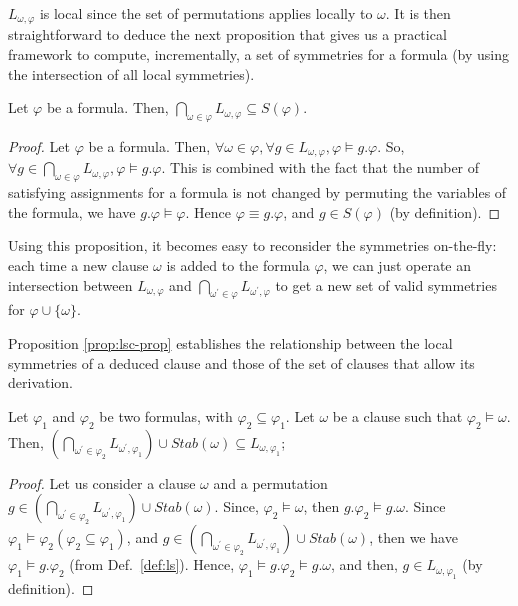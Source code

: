 $L_{\omega,\varphi}$ is local since the set of permutations applies locally to
$\omega$. It is then straightforward to deduce the next proposition that gives us a
practical framework to compute, incrementally, a set of symmetries for a
formula (by using the intersection of all local symmetries).

\begin{proposition}
	\label{prop:gls-prop}
	Let $\varphi$ be a formula. Then,  $\underset{\omega \in \varphi}{\bigcap}L_{\omega,\varphi} 
	\subseteq S(\varphi)$.
\end{proposition}

\begin{proof}
	Let $\varphi$ be a formula. Then, $\forall \omega \in \varphi, \forall g \in L_{\omega,\varphi}, \varphi \models g.\varphi $. So, $\forall g \in \underset{\omega \in \varphi}{\bigcap}L_{\omega,\varphi}, \varphi \models g.\varphi$. This is combined with the fact that the number of satisfying assignments for a formula is not changed by permuting the variables of the formula, we have $g.\varphi \models \varphi$. Hence $\varphi \equiv g.\varphi$, and $g \in S(\varphi)$ (by definition). 
\end{proof}

Using this proposition, it becomes easy to reconsider the symmetries
on-the-fly: each time a new clause $\omega$ is added to the formula $\varphi$,
we can just operate an intersection between $L_{\omega,\varphi}$ and
$\underset{\omega^\prime \in \varphi}{\bigcap}L_{\omega^\prime,\varphi}$ to get
a new set of valid symmetries for $\varphi \cup \{\omega\}$.

\medskip
Proposition \ref{prop:lsc-prop} establishes the relationship between the local symmetries of a deduced clause and those of the set of clauses that allow its derivation. 

\begin{proposition}
	\label{prop:lsc-prop}
	Let $\varphi_1$ and $\varphi_2$ be two formulas, with $\varphi_2 \subseteq \varphi_1$. 
	Let $\omega$ be a clause such that $\varphi_2 \models \omega$. Then, 
	$(\underset{\omega^\prime \in \varphi_2}{\bigcap}L_{\omega^\prime,\varphi_1})
	\cup Stab(\omega) \subseteq L_{\omega,\varphi_1}$;
\end{proposition} 


\begin{proof}
	Let us consider a clause $\omega$ and a permutation $g \in 
	(\underset{\omega^\prime \in \varphi_2}{\bigcap}L_{\omega^\prime,\varphi_1})
	\cup Stab(\omega)$.
	Since, $\varphi_2 \models \omega$, then  $g.\varphi_2 \models g.\omega$. Since $\varphi_1 \models \varphi_2 (\varphi_2 \subseteq \varphi_1)$, and 
	$g \in 
	(\underset{\omega^\prime \in \varphi_2}{\bigcap}L_{\omega^\prime,\varphi_1})
	\cup Stab(\omega)$, then we have $\varphi_1 \models g.\varphi_2$ (from Def.~\ref{def:ls}). Hence, $\varphi_1 \models g.\varphi_2 \models g.\omega$, and then, $g \in L_{\omega,\varphi_1}$ (by definition). 
\end{proof}


